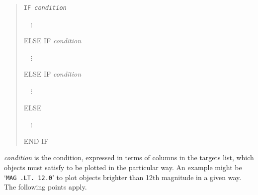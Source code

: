 \documentclass[twoside,11pt]{starlink}
\begin{document}
\begin{quote}
{\tt IF \textit{condition}

~~$\vdots$

ELSE IF \textit{condition}

~~$\vdots$

ELSE IF \textit{condition}

~~$\vdots$

ELSE

~~$\vdots$

END IF}
\end{quote}

\textit{condition} is the condition, expressed in terms of columns in the
targets list, which objects must satisfy to be plotted in the particular
way.  An example might be `\texttt{MAG .LT. 12.0}' to plot objects brighter
than 12th magnitude in a given way.  The following points apply.
\end{document}
